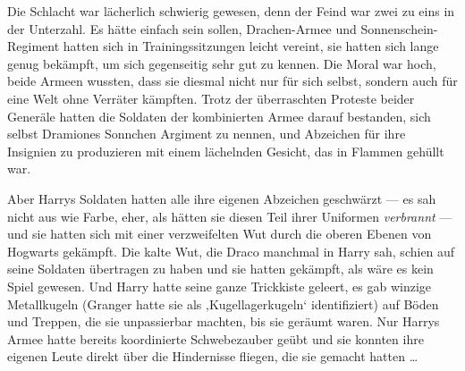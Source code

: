 Die Schlacht war lächerlich schwierig gewesen, denn der Feind war zwei zu eins in der Unterzahl. Es hätte einfach sein sollen, Drachen-Armee und Sonnenschein-Regiment hatten sich in Trainingssitzungen leicht vereint, sie hatten sich lange genug bekämpft, um sich gegenseitig sehr gut zu kennen. Die Moral war hoch, beide Armeen wussten, dass sie diesmal nicht nur für sich selbst, sondern auch für eine Welt ohne Verräter kämpften. Trotz der überraschten Proteste beider Generäle hatten die Soldaten der kombinierten Armee darauf bestanden, sich selbst Dramiones Sonnchen Argiment zu nennen, und Abzeichen für ihre Insignien zu produzieren mit einem lächelnden Gesicht, das in Flammen gehüllt war.

Aber Harrys Soldaten hatten alle ihre eigenen Abzeichen geschwärzt — es sah nicht aus wie Farbe, eher, als hätten sie diesen Teil ihrer Uniformen \emph{verbrannt} — und sie hatten sich mit einer verzweifelten Wut durch die oberen Ebenen von Hogwarts gekämpft. Die kalte Wut, die Draco manchmal in Harry sah, schien auf seine Soldaten übertragen zu haben und sie hatten gekämpft, als wäre es kein Spiel gewesen. Und Harry hatte seine ganze Trickkiste geleert, es gab winzige Metallkugeln (Granger hatte sie als ‚Kugellagerkugeln‘ identifiziert) auf Böden und Treppen, die sie unpassierbar machten, bis sie geräumt waren. Nur Harrys Armee hatte bereits koordinierte Schwebezauber geübt und sie konnten ihre eigenen Leute direkt über die Hindernisse fliegen, die sie gemacht hatten …


